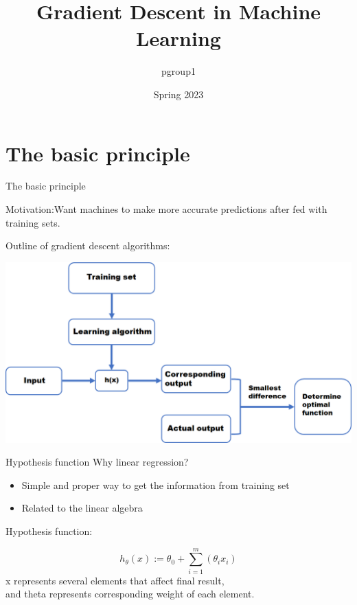 \documentclass{beamer}
\title{Gradient Descent in Machine Learning}
\author{pgroup1}
\date{Spring 2023}
\begin{document}
\maketitle




\section{The basic principle}

\begin{frame}{The basic principle}

Motivation:Want machines to make more accurate predictions after fed with training sets.

Outline of gradient descent algorithms:
\begin{center}
 \includegraphics[width=.9\columnwidth]{img/outline.PNG}
\end{center}
\end{frame}
\begin{frame}{Hypothesis function}
Why linear regression?
\begin{itemize}
    \item Simple and proper way to get the information from training set
    \item Related to the linear algebra
\end{itemize}
\begin{theorem}

                        Hypothesis function:
  
         $$h_{\theta}(x):=\theta_0+\sum_{i=1}^{m}(\theta_i x_i)$$
         x represents several elements that affect final result,\\
         and theta represents corresponding weight of each element.



\end{theorem}
\end{frame}
\end{document}
